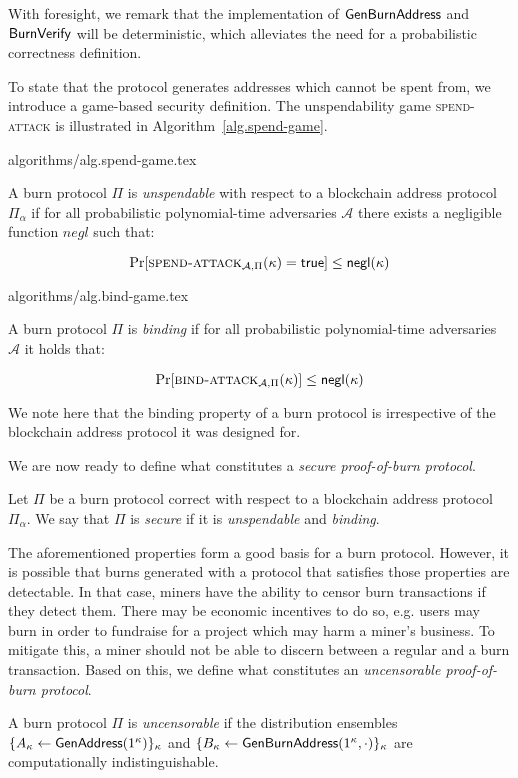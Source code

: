 With foresight, we remark that the implementation of $\mathsf{GenBurnAddress}$ and $\mathsf{BurnVerify}$ will be deterministic, which alleviates the need for a probabilistic correctness definition.

To state that the protocol generates addresses which cannot be spent from, we introduce a game-based security definition. The unspendability game \textsc{spend-attack} is illustrated in Algorithm~\ref{alg.spend-game}.

{algorithms/alg.spend-game.tex}

\begin{definition}[Unspendability]
  A burn protocol $\Pi$ is \emph{unspendable} with respect to a blockchain address protocol $\Pi_\alpha$ if
  for all probabilistic polynomial-time adversaries $\mathcal{A}$ there exists a negligible function $negl$ such that:

  \[
    \Pr[\textsc{spend-attack}_{\mathcal{A},
    \Pi}(\kappa) = \textsf{true}] \leq \textsf{negl}(\kappa)
  \]
\end{definition}

{algorithms/alg.bind-game.tex}

\begin{definition}[Binding]
  A burn protocol $\Pi$ is \emph{binding} if
  for all probabilistic polynomial-time adversaries $\mathcal{A}$ it holds that:

  \[
    \Pr[\textsc{bind-attack}_{\mathcal{A},\Pi}(\kappa)] \leq \textsf{negl}(\kappa)
  \]
\end{definition}

We note here that the binding property of a burn protocol is irrespective of the blockchain address protocol it was designed for.

We are now ready to define what constitutes a \emph{secure proof-of-burn protocol}.

\begin{definition}[Security]
  Let $\Pi$ be a burn protocol correct with respect to a blockchain address protocol $\Pi_\alpha$. We say that $\Pi$ is \emph{secure} if it is \emph{unspendable} and \emph{binding}.
\end{definition}

The aforementioned properties form a good basis for a burn protocol. However, it is possible that burns generated with a protocol that satisfies those properties are detectable. In that case, miners have the ability to censor burn transactions if they detect them. There may be economic incentives to do so, e.g. users may burn in order to fundraise for a project which may harm a miner's business. To mitigate this, a miner should not be able to discern between a regular and a burn transaction. Based on this, we define what constitutes an \emph{uncensorable proof-of-burn protocol}.

\begin{definition}[Uncensorability]
  A burn protocol $\Pi$ is \emph{uncensorable} if
  the distribution ensembles $\{A_\kappa \gets \mathsf{GenAddress}(1^\kappa)\}_\kappa$ and
  $\{B_\kappa \gets \mathsf{GenBurnAddress}(1^\kappa, \cdot)\}_\kappa$ are computationally indistinguishable.
\end{definition}
